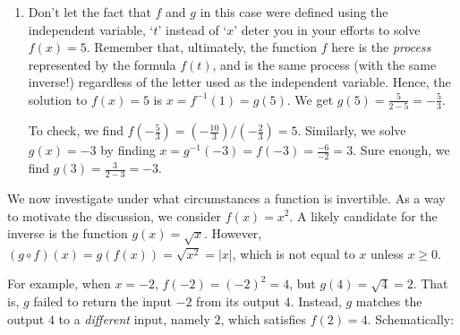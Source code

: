\documentclass{ximera}
\begin{document}
\begin{example}
\begin{explanation}
\begin{enumerate}
\begin{enumerate}
Using the desmos interactive below, we can select which graph (the graph of $f$, the graph of $g$, or both) to display to check our findings above.  Note that when both graphs are displayed, they do appear symmetric about the line $y = t$.

\begin{center}
\end{center}

\end{enumerate}



\item  Don't let the fact that $f$ and $g$ in this case were defined using the independent variable, `$t$' instead of `$x$' deter you in your efforts to solve $f(x) = 5$.  Remember that, ultimately, the function $f$ here is the \textit{process} represented by the formula $f(t)$, and  is the same process (with the same inverse!) regardless of the letter used as the independent variable.  Hence, the solution to  $f(x) = 5$ is $x = f^{-1}(1) = g(5)$. We get $g(5) = \frac{5}{2-5} = -\frac{5}{3}$.  

To check, we find $f\left(-\frac{5}{3} \right) = \left(-\frac{10}{3}\right) / \left(-\frac{2}{3} \right) = 5$.  Similarly, we solve $g(x) = -3$ by finding $x = g^{-1}(-3) = f(-3) = \frac{-6}{-2} = 3$.  Sure enough, we find $g(3) = \frac{3}{2-3} = -3$. 

\end{enumerate}
\end{explanation}
\end{example}

We now investigate under what circumstances a function is invertible. As a way to motivate the discussion, we consider  $f(x) = x^2$.  A likely candidate for the inverse is the function $g(x) = \sqrt{x}$.  However,  $(g\circ f)(x) = g(f(x)) = \sqrt{x^2} = |x|$, which is not equal to $x$ unless $x \geq 0$.  

For example, when $x=-2$,  $f(-2)= (-2)^2 = 4$, but $g(4) = \sqrt{4}=2$.  That is, $g$ failed to return the input $-2$ from its output $4$.  Instead, $g$ matches the output $4$ to a \textit{different} input, namely $2$, which satisfies $f(2) = 4$.  Schematically:
\end{document}
